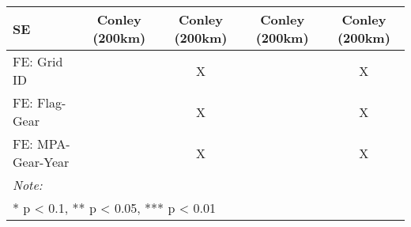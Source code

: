 \begin{table}
\begin{tabular}[t]{lcccc}
\hspace{1em}SE & Conley (200km) & Conley (200km) & Conley (200km) & Conley (200km)\\
\midrule
FE: Grid ID &  & X &  & X\\
FE: Flag-Gear &  & X &  & X\\
FE: MPA-Gear-Year &  & X &  & X\\
\midrule
\bottomrule
\multicolumn{5}{l}{\rule{0pt}{1em}\textit{Note: }}\\
\multicolumn{5}{l}{\rule{0pt}{1em}* p < 0.1, ** p < 0.05, *** p < 0.01}\\
\end{tabular}
\end{table}